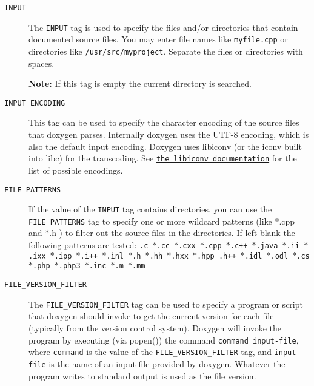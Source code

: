  \begin{description}
\item[{\tt INPUT} ] The {\tt INPUT} tag is used to specify the files and/or directories that contain documented source files. You may enter file names like {\tt myfile.cpp} or directories like {\tt /usr/src/myproject}. Separate the files or directories with spaces.\par


{\bf Note:} If this tag is empty the current directory is searched.

\label{config_cfg_input_encoding}
\hypertarget{config_cfg_input_encoding}{}
 \item[{\tt INPUT\_\-ENCODING} ] This tag can be used to specify the character encoding of the source files that doxygen parses. Internally doxygen uses the UTF-8 encoding, which is also the default input encoding. Doxygen uses libiconv (or the iconv built into libc) for the transcoding. See \href{http://www.gnu.org/software/libiconv}{\tt the libiconv documentation} for the list of possible encodings.

\label{config_cfg_file_patterns}
\hypertarget{config_cfg_file_patterns}{}
 \item[{\tt FILE\_\-PATTERNS} ] If the value of the {\tt INPUT} tag contains directories, you can use the {\tt FILE\_\-PATTERNS} tag to specify one or more wildcard patterns (like {\tt $\ast$}.cpp and {\tt $\ast$}.h ) to filter out the source-files in the directories. If left blank the following patterns are tested: {\tt  .c $\ast$.cc $\ast$.cxx $\ast$.cpp $\ast$.c++ $\ast$.java $\ast$.ii $\ast$.ixx $\ast$.ipp $\ast$.i++ $\ast$.inl $\ast$.h $\ast$.hh $\ast$.hxx $\ast$.hpp .h++ $\ast$.idl $\ast$.odl $\ast$.cs $\ast$.php $\ast$.php3 $\ast$.inc $\ast$.m $\ast$.mm }

\label{config_cfg_file_version_filter}
\hypertarget{config_cfg_file_version_filter}{}
 \item[{\tt FILE\_\-VERSION\_\-FILTER} ] The {\tt FILE\_\-VERSION\_\-FILTER} tag can be used to specify a program or script that doxygen should invoke to get the current version for each file (typically from the version control system). Doxygen will invoke the program by executing (via popen()) the command {\tt command input-file}, where {\tt command} is the value of the {\tt FILE\_\-VERSION\_\-FILTER} tag, and {\tt input-file} is the name of an input file provided by doxygen. Whatever the program writes to standard output is used as the file version.


\end{description}
